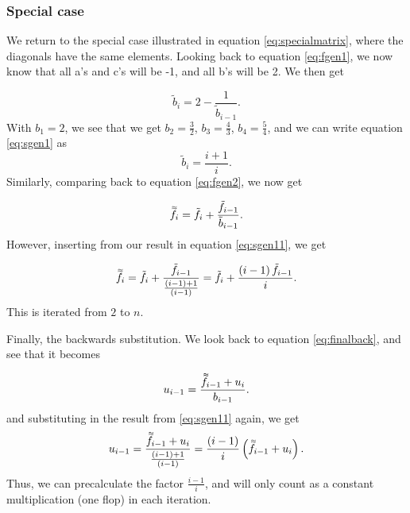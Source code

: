 \documentclass{emulateapj}
\newcommand{\dbtilde}[1]{\accentset{\approx}{#1}}
\begin{document}
\subsubsection{Special case}
We return to the special case illustrated in equation \ref{eq:specialmatrix}, where the diagonals have the same elements. Looking back to equation \ref{eq:fgen1}, we now know that all a's and c's will be -1, and all b's will be 2. We then get

\begin{equation} \label{eq:sgen1}
    \tilde{b}_i = 2 - \frac{1}{\tilde{b}_{i-1}}.
\end{equation}
With $b_1 = 2$, we see that we get $b_2 = \frac{3}{2}$, $b_3 = \frac{4}{3}$, $b_4 = \frac{5}{4}$, and we can write equation \ref{eq:sgen1} as 
\begin{equation} \label{eq:sgen11}
    \tilde{b}_i = \frac{i+1}{i}.
\end{equation}
Similarly, comparing back to equation \ref{eq:fgen2}, we now get

\begin{equation} \label{eq:sgen1}
    \dbtilde{f_{i}} = \tilde{f_{i}} + \frac{\tilde{f}_{i-1}}{\tilde{b}_{i-1}}.
\end{equation}
However, inserting from our result in equation \ref{eq:sgen11}, we get

\begin{equation} \label{eq:sgen22}
    \dbtilde{f_{i}} = \tilde{f_{i}} + \frac{ \tilde{f}_{i-1}}{\frac{\left(i-1\right)+1}{\left(i-1\right)}} = \tilde{f_{i}} + \frac{\left(i-1\right)\tilde{f}_{i-1}}{i}.
\end{equation}
This is iterated from $2$ to $n$.

Finally, the backwards substitution. We look back to equation \ref{eq:finalback}, and see that it becomes 

\begin{equation} \label{eq:sgenback}
    u_{i-1} =  \frac{\dbtilde{f}_{i-1} + u_i }{b_{i-1}}.
\end{equation}
and substituting in the result from \ref{eq:sgen11} again, we get 
\begin{equation} \label{eq:sgenback}
    u_{i-1} =  \frac{\dbtilde{f}_{i-1} + u_i }{ \frac{\left(i-1\right)+1}{\left(i-1\right)} } = \frac{\left(i-1\right)}{i}\left(\dbtilde{f}_{i-1} + u_i\right) .
\end{equation}
Thus, we can precalculate the factor $\frac{i-1}{i}$, and will only count as a constant multiplication (one flop) in each iteration.
\end{document}
